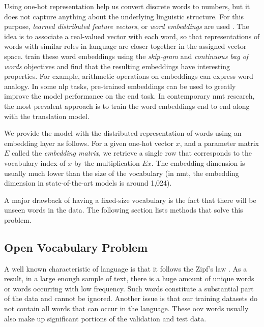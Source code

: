 Using one-hot representation help us convert discrete words to numbers, but it
does not capture anything about the underlying linguistic structure.  For this
purpose, \emph{learned distributed feature vectors}, or \emph{word embeddings}
are used \citep{bengio2003neural, collobert-weston-2007-fast}. The idea is to
associate a real-valued vector with each word, so that representations of words
with similar roles in language are closer together in the assigned vector
space. \citet{mikolov-etal-2013-distributed} train these word embeddings using
the \emph{skip-gram} and \emph{continuous bag of words} objectives and find
that the resulting embeddings have interesting properties. For example,
arithmetic operations on embeddings can express word analogy.  In some \ac{nlp}
tasks, pre-trained embeddings can be used to greatly improve the model
performance on the end task. In contemporary \ac{nmt} research, the most
prevalent approach is to train the word embeddings end to end along with the
translation model.

We provide the model with the distributed representation of words using an
embedding layer as follows. For a given one-hot vector $x$, and a
parameter matrix $E$ called the \emph{embedding matrix}, we retrieve a single
row that corresponds to the vocabulary index of $x$ by the
multiplication $E x$.
The embedding dimension is usually much lower than the size of the vocabulary
(in \ac{nmt}, the embedding dimension in state-of-the-art models is around
1,024).

A major drawback of having a fixed-size vocabulary is the fact that there will
be unseen words in the data. The following section lists methods that solve
this problem.

\subsection{Open Vocabulary Problem}
\label{subsec:openvoc}

A well known characteristic of language is that it follows the Zipf's law
\citep{zipf1949human}. As a result, in a large enough sample of text, there is
a huge amount of unique words or words occurring with low frequency. Such words
constitute a substantial part of the data and cannot be ignored.  Another issue
is that our training datasets do not contain all words that can occur in the
language. These \ac{oov} words usually also make up significant portions of the
validation and test data.

